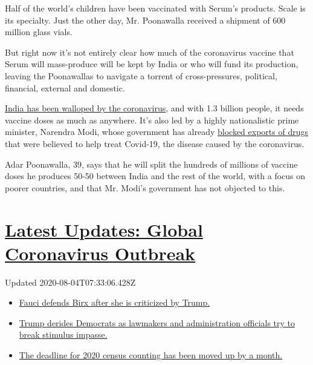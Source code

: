 Half of the world's children have been vaccinated with Serum's products.
Scale is its specialty. Just the other day, Mr. Poonawalla received a
shipment of 600 million glass vials.

But right now it's not entirely clear how much of the coronavirus
vaccine that Serum will mass-produce will be kept by India or who will
fund its production, leaving the Poonawallas to navigate a torrent of
cross-pressures, political, financial, external and domestic.

\href{https://www.nytimes3xbfgragh.onion/2020/07/16/world/asia/coronavirus-india-million-cases.html}{India
has been walloped by the coronavirus}, and with 1.3 billion people, it
needs vaccine doses as much as anywhere. It's also led by a highly
nationalistic prime minister, Narendra Modi, whose government has
already
\href{https://www.nytimes3xbfgragh.onion/2020/03/03/business/coronavirus-india-drugs.html}{blocked
exports of drugs} that were believed to help treat Covid-19, the disease
caused by the coronavirus.

Adar Poonawalla, 39, says that he will split the hundreds of millions of
vaccine doses he produces 50-50 between India and the rest of the world,
with a focus on poorer countries, and that Mr. Modi's government has not
objected to this.

\hypertarget{latest-updates-global-coronavirus-outbreak}{%
\section{\texorpdfstring{\href{https://www.nytimes3xbfgragh.onion/2020/08/03/world/coronavirus-covid-19.html?action=click\&pgtype=Article\&state=default\&region=MAIN_CONTENT_1\&context=storylines_live_updates}{Latest
Updates: Global Coronavirus
Outbreak}}{Latest Updates: Global Coronavirus Outbreak}}\label{latest-updates-global-coronavirus-outbreak}}

Updated 2020-08-04T07:33:06.428Z

\begin{itemize}
\tightlist
\item
  \href{https://www.nytimes3xbfgragh.onion/2020/08/03/world/coronavirus-covid-19.html?action=click\&pgtype=Article\&state=default\&region=MAIN_CONTENT_1\&context=storylines_live_updates\#link-4547638f}{Fauci
  defends Birx after she is criticized by Trump.}
\item
  \href{https://www.nytimes3xbfgragh.onion/2020/08/03/world/coronavirus-covid-19.html?action=click\&pgtype=Article\&state=default\&region=MAIN_CONTENT_1\&context=storylines_live_updates\#link-15e7f995}{Trump
  derides Democrats as lawmakers and administration officials try to
  break stimulus impasse.}
\item
  \href{https://www.nytimes3xbfgragh.onion/2020/08/03/world/coronavirus-covid-19.html?action=click\&pgtype=Article\&state=default\&region=MAIN_CONTENT_1\&context=storylines_live_updates\#link-e5a2cda}{The
  deadline for 2020 census counting has been moved up by a month.}
\end{itemize}

